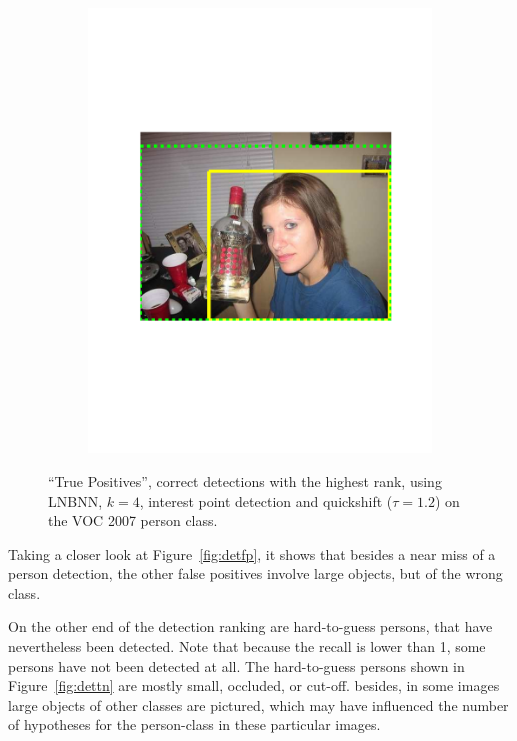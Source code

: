 \begin{figure}[hbt]
\begin{subfigure}[b]{0.45\textwidth}
        \includegraphics[width=\textwidth]{TP63}
        \caption{}
        \label{fig:dettp4}
    \end{subfigure}
    \caption{``True Positives'', correct detections with the highest rank, using LNBNN, $k=4$, interest point detection and quickshift ($\tau=1.2$) on the VOC 2007 person class.}
    \label{fig:dettp}
\end{figure}

Taking a closer look at Figure~\ref{fig:detfp}, it shows that besides a near miss of a person detection, the other false positives involve large objects, but of the wrong class.

On the other end of the detection ranking are hard-to-guess persons, that have nevertheless been detected. Note that because the recall is lower than 1, some persons have not been detected at all. The hard-to-guess persons shown in Figure~\ref{fig:dettn} are mostly small, occluded, or cut-off. besides, in some images large objects of other classes are pictured, which may have influenced the number of hypotheses for the person-class in these particular images.

